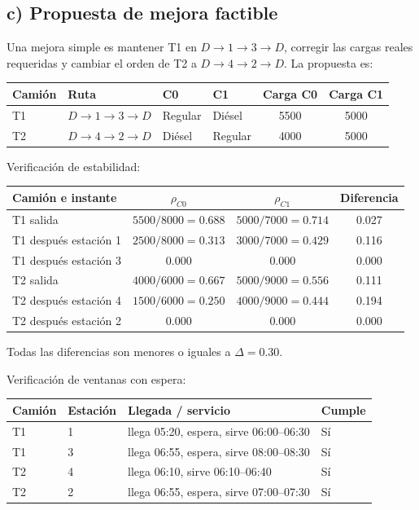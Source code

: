 \documentclass[11pt,letterpaper]{article}
\begin{document}
\subsection{c) Propuesta de mejora factible}

Una mejora simple es mantener T1 en \(D\to1\to3\to D\), corregir las cargas reales requeridas
y cambiar el orden de T2 a \(D\to4\to2\to D\). La propuesta es:

\begin{table}[h]
\centering
\begin{tabular}{llllcc}
\toprule
\textbf{Camión} & \textbf{Ruta} & \textbf{C0} & \textbf{C1} & \textbf{Carga C0} & \textbf{Carga C1} \\
\midrule
T1 & \(D\to1\to3\to D\) & Regular & Diésel & 5500 & 5000 \\
T2 & \(D\to4\to2\to D\) & Diésel & Regular & 4000 & 5000 \\
\bottomrule
\end{tabular}
\end{table}

Verificación de estabilidad:

\begin{table}[h]
\centering
\begin{tabular}{lccc}
\toprule
\textbf{Camión e instante} & \(\rho_{C0}\) & \(\rho_{C1}\) & \textbf{Diferencia} \\
\midrule
T1 salida & \(5500/8000=0.688\) & \(5000/7000=0.714\) & 0.027 \\
T1 después estación 1 & \(2500/8000=0.313\) & \(3000/7000=0.429\) & 0.116 \\
T1 después estación 3 & 0.000 & 0.000 & 0.000 \\
T2 salida & \(4000/6000=0.667\) & \(5000/9000=0.556\) & 0.111 \\
T2 después estación 4 & \(1500/6000=0.250\) & \(4000/9000=0.444\) & 0.194 \\
T2 después estación 2 & 0.000 & 0.000 & 0.000 \\
\bottomrule
\end{tabular}
\end{table}

Todas las diferencias son menores o iguales a \(\Delta=0.30\).

Verificación de ventanas con espera:

\begin{table}[h]
\centering
\begin{tabular}{llll}
\toprule
\textbf{Camión} & \textbf{Estación} & \textbf{Llegada / servicio} & \textbf{Cumple} \\
\midrule
T1 & 1 & llega 05:20, espera, sirve 06:00--06:30 & Sí \\
T1 & 3 & llega 06:55, espera, sirve 08:00--08:30 & Sí \\
T2 & 4 & llega 06:10, sirve 06:10--06:40 & Sí \\
T2 & 2 & llega 06:55, espera, sirve 07:00--07:30 & Sí \\
\bottomrule
\end{tabular}
\end{table}
\end{document}
